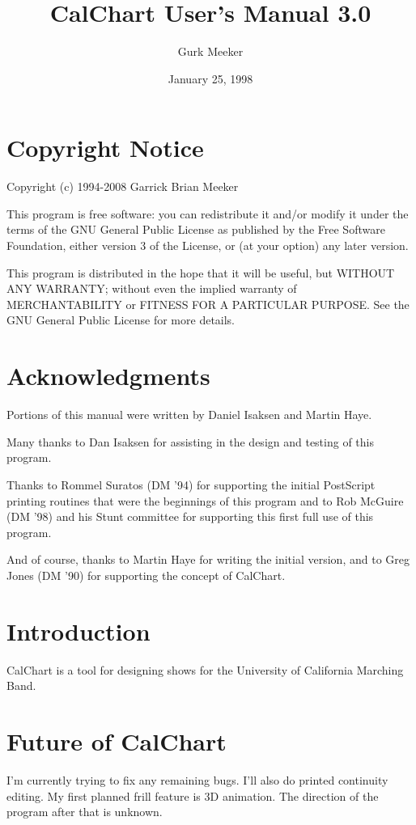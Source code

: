 \title{CalChart User's Manual 3.0}
\author{Gurk Meeker}
\date{January 25, 1998}
\makeindex

\maketitle
\tableofcontents

\chapter*{Copyright Notice}\label{copyright}

Copyright (c) 1994-2008 Garrick Brian Meeker

This program is free software: you can redistribute it and/or modify
it under the terms of the GNU General Public License as published by
the Free Software Foundation, either version 3 of the License, or
(at your option) any later version.

This program is distributed in the hope that it will be useful,
but WITHOUT ANY WARRANTY; without even the implied warranty of
MERCHANTABILITY or FITNESS FOR A PARTICULAR PURPOSE.  See the
GNU General Public License for more details.

\chapter*{Acknowledgments}\label{acknowledge}

Portions of this manual were written by Daniel Isaksen and Martin Haye.

Many thanks to Dan Isaksen for assisting in the design and testing of
this program.

Thanks to Rommel Suratos (DM '94) for supporting the initial PostScript
printing routines that were the beginnings of this program and to Rob
McGuire (DM '98) and his Stunt committee for supporting this first full
use of this program.

And of course, thanks to Martin Haye for writing the initial version,
and to Greg Jones (DM '90) for supporting the concept of CalChart.

\chapter{Introduction}

CalChart is a tool for designing shows for the University of California
Marching Band.








\chapter{Future of CalChart}\label{future}

I'm currently trying to fix any remaining bugs.  I'll also do printed
continuity editing.  My first planned frill feature is 3D animation.
The direction of the program after that is unknown.


